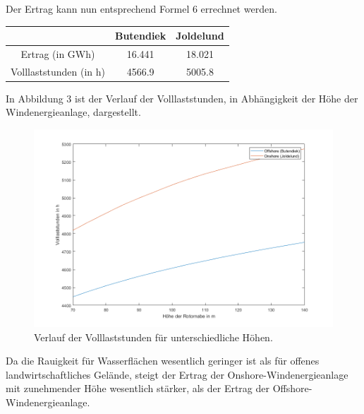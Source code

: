 \documentclass[a4paper,12pt]{article}
\begin{document}
	\noindent Der Ertrag kann nun entsprechend Formel 6 errechnet werden.
	\begin{table}[h]
		\centering
		\begin{tabular}{|c|c|c|}
			\hline
			& Butendiek & Joldelund \\ \hline
			Ertrag (in GWh)        & 16.441    & 18.021    \\ \hline
			Volllaststunden (in h) & 4566.9    & 5005.8    \\ \hline
		\end{tabular}
	\end{table}
	In Abbildung 3 ist der Verlauf der Volllaststunden, in Abhängigkeit der Höhe der Windenergieanlage, dargestellt.
	\begin{figure}[H]
		\centering
		\includegraphics[width=12cm]{img/results/Vergleich_Volllaststunden}
		\caption{Verlauf der Volllaststunden für unterschiedliche Höhen.}
	\end{figure}
	\noindent Da die Rauigkeit für Wasserflächen wesentlich geringer ist als für offenes landwirtschaftliches Gelände, steigt der Ertrag der Onshore-Windenergieanlage mit zunehmender Höhe wesentlich stärker, als der Ertrag der Offshore-Windenergieanlage.
\end{document}
